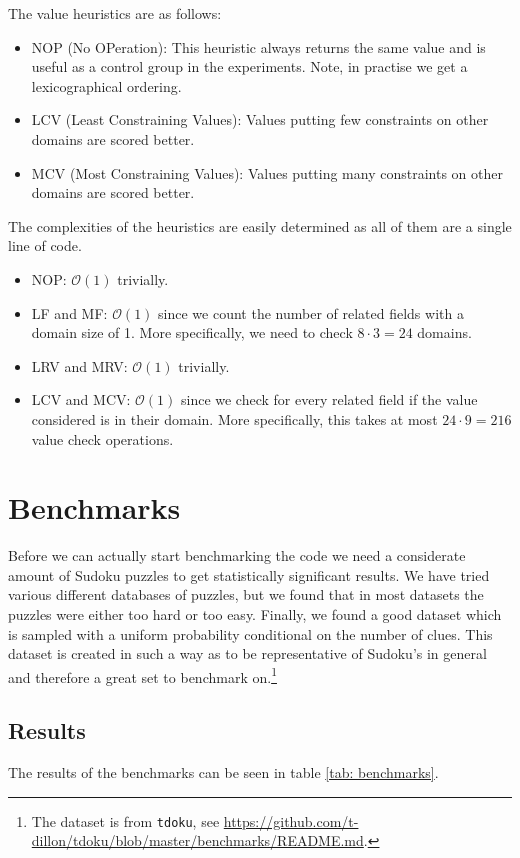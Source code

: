 \documentclass[a4paper]{article}
\begin{document}
\noindent
The value heuristics are as follows:
\begin{itemize}
	\item NOP (No OPeration): This heuristic always returns the same value and
		is useful as a control group in the experiments. Note, in practise we
		get a lexicographical ordering.
	\item LCV (Least Constraining Values): Values putting few constraints on
		other domains are scored better.
	\item MCV (Most Constraining Values): Values putting many constraints on
		other domains are scored better.
\end{itemize}

\noindent
The complexities of the heuristics are easily determined as all of them are a
single line of code.
\begin{itemize}
	\item NOP: $\mathcal{O}(1)$ trivially.
	\item LF and MF: $\mathcal{O}(1)$ since we count the number of related
		fields with a domain size of 1. More specifically, we need to check $8
		\cdot 3 = 24$ domains.
	\item LRV and MRV: $\mathcal{O}(1)$ trivially.
	\item LCV and MCV: $\mathcal{O}(1)$ since we check for every related field
		if the value considered is in their domain. More specifically, this
		takes at most $24 \cdot 9 = 216$ value check operations.
\end{itemize}

\section{Benchmarks}
Before we can actually start benchmarking the code we need a considerate amount
of Sudoku puzzles to get statistically significant results. We have tried
various different databases of puzzles, but we found that in most datasets the
puzzles were either too hard or too easy. Finally, we found a good dataset which
is sampled with a uniform probability conditional on the number of clues. This
dataset is created in such a way as to be representative of Sudoku's in general
and therefore a great set to benchmark on.\footnote{The dataset is from
\texttt{tdoku}, see
\url{https://github.com/t-dillon/tdoku/blob/master/benchmarks/README.md}.}

\subsection{Results}
The results of the benchmarks can be seen in table \ref{tab: benchmarks}.
\end{document}
